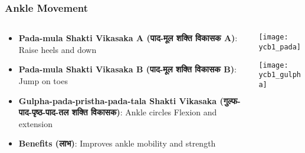 \begin{frame}[fragile]\frametitle{Ankle Movement}
 \begin{columns}
    \begin{column}[T]{0.5\linewidth}
      \begin{itemize}
		\item \textbf{Pada-mula Shakti Vikasaka A (पाद-मूल शक्ति विकासक A)}: Raise heels and down
		\item \textbf{Pada-mula Shakti Vikasaka B (पाद-मूल शक्ति विकासक B)}: Jump on toes %
		\item \textbf{Gulpha-pada-pristha-pada-tala Shakti Vikasaka (गुल्फ-पाद-पृष्ठ-पाद-तल शक्ति विकासक)}: Ankle circles Flexion and extension
		\item \textbf{Benefits (लाभ)}: Improves ankle mobility and strength
	  \end{itemize}
    \end{column}
    \begin{column}[T]{0.5\linewidth}
		\begin{center}
		\texttt{[image: ycb1\_pada]}
		
		
		\texttt{[image: ycb1\_gulpha]}
		
		\end{center}	
    \end{column}
\end{columns}
\end{frame}


